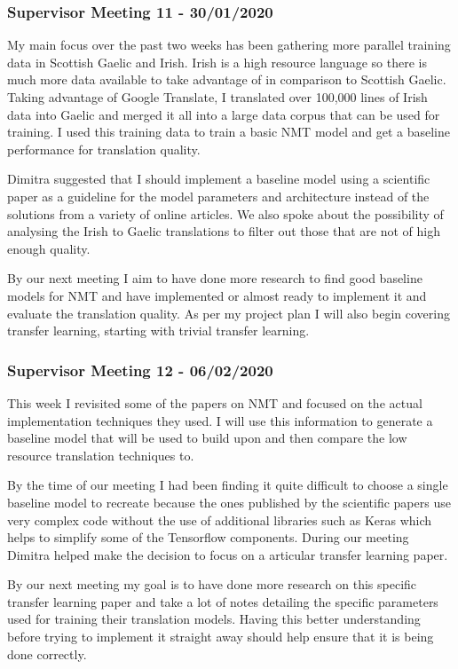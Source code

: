 \subsubsection{Supervisor Meeting 11 - 30/01/2020}
My main focus over the past two weeks has been gathering more parallel training data in Scottish Gaelic and Irish. Irish is a high resource language so there is much more data available to take advantage of in comparison to Scottish Gaelic. Taking advantage of Google Translate, I translated over 100,000 lines of Irish data into Gaelic and merged it all into a large data corpus that can be used for training. I used this training data to train a basic NMT model and get a baseline performance for translation quality.

Dimitra suggested that I should implement a baseline model using a scientific paper as a guideline for the model parameters and architecture instead of the solutions from a variety of online articles. We also spoke about the possibility of analysing the Irish to Gaelic translations to filter out those that are not of high enough quality.

By our next meeting I aim to have done more research to find good baseline models for NMT and have implemented or almost ready to implement it and evaluate the translation quality. As per my project plan I will also begin covering transfer learning, starting with trivial transfer learning.

\subsubsection{Supervisor Meeting 12 - 06/02/2020}
This week I revisited some of the papers on NMT and focused on the actual implementation techniques they used. I will use this information to generate a baseline model that will be used to build upon and then compare the low resource translation techniques to.

By the time of our meeting I had been finding it quite difficult to choose a single baseline model to recreate because the ones published by the scientific papers use very complex code without the use of additional libraries such as Keras which helps to simplify some of the Tensorflow components. During our meeting Dimitra helped make the decision to focus on a articular transfer learning paper.

By our next meeting my goal is to have done more research on this specific transfer learning paper and take a lot of notes detailing the specific parameters used for training their translation models. Having this better understanding before trying to implement it straight away should help ensure that it is being done correctly.


